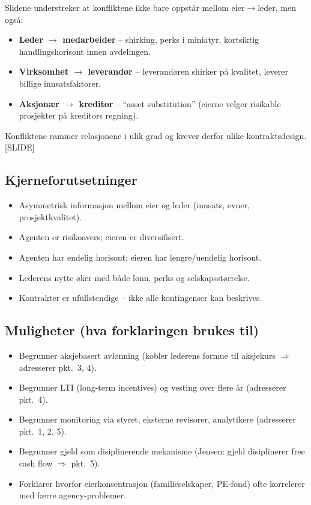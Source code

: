 Slidene understreker at konfliktene ikke bare oppstår mellom eier$\to$leder, men også:
\begin{itemize}
\item \textbf{Leder $\to$ medarbeider} -- shirking, perks i miniatyr, kortsiktig handlingshorisont innen avdelingen.
\item \textbf{Virksomhet $\to$ leverandør} -- leverandøren shirker på kvalitet, leverer billige innsatsfaktorer.
\item \textbf{Aksjonær $\to$ kreditor} -- ``asset substitution'' (eierne velger risikable prosjekter på kreditors regning).
\end{itemize}
Konfliktene rammer relasjonene i ulik grad og krever derfor ulike kontraktsdesign. [SLIDE]

\subsection*{Kjerneforutsetninger}
\begin{itemize}
\item Asymmetrisk informasjon mellom eier og leder (innsats, evner, prosjektkvalitet).
\item Agenten er risikoavers; eieren er diversifisert.
\item Agenten har endelig horisont; eieren har lengre/uendelig horisont.
\item Lederens nytte øker med både lønn, perks og selskapsstørrelse.
\item Kontrakter er ufullstendige -- ikke alle kontingenser kan beskrives.
\end{itemize}

\subsection*{Muligheter (hva forklaringen brukes til)}
\begin{itemize}
\item Begrunner aksjebasert avlønning (kobler lederens formue til aksjekurs $\Rightarrow$ adresserer pkt.\ 3, 4).
\item Begrunner LTI (long-term incentives) og vesting over flere år (adresserer pkt.\ 4).
\item Begrunner monitoring via styret, eksterne revisorer, analytikere (adresserer pkt.\ 1, 2, 5).
\item Begrunner gjeld som disiplinerende mekanisme (Jensen: gjeld disiplinerer free cash flow $\Rightarrow$ pkt.\ 5).
\item Forklarer hvorfor eierkonsentrasjon (familieselskaper, PE-fond) ofte korrelerer med færre agency-problemer.
\end{itemize}

